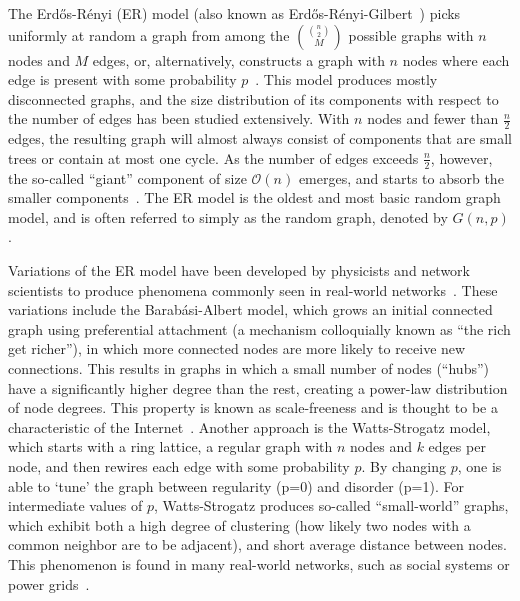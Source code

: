 The Erdős-Rényi (ER) model (also known as Erdős-Rényi-Gilbert~\cite{fienberg-2012}) picks uniformly at random a graph from among the $\binom{\binom{n}{2}}{M}$ possible graphs with $n$ nodes and $M$ edges, or, alternatively, constructs a graph with $n$ nodes where each edge is present with some probability $p$~\cite{erdos-1959, gilbert-1959}. This model produces mostly disconnected graphs, and the size distribution of its components with respect to the number of edges has been studied extensively. With $n$ nodes and fewer than $\frac{n}{2}$ edges, the resulting graph will almost always consist of components that are small trees or contain at most one cycle. As the number of edges exceeds $\frac{n}{2}$, however, the so-called ``giant'' component of size $\mathcal{O}(n)$ emerges, and starts to absorb the smaller components~\cite{janson1993birth}. The ER model is the oldest and most basic random graph model, and is often referred to simply as the random graph, denoted by $G(n,p)$.

Variations of the ER model have been developed by physicists and network scientists to produce phenomena commonly seen in real-world networks~\cite{fienberg-2012}. These variations include the Barabási-Albert model, which grows an initial connected graph using preferential attachment (a mechanism colloquially known as ``the rich get richer''), in which more connected nodes are more likely to receive new connections. This results in graphs in which a small number of nodes (``hubs'') have a significantly higher degree than the rest, creating a power-law distribution of node degrees. This property is known as scale-freeness and is thought to be a characteristic of the Internet~\cite{barabasi-albert}. Another approach is the Watts-Strogatz model, which starts with a ring lattice, a regular graph with $n$ nodes and $k$ edges per node, and then rewires each edge with some probability $p$. By changing $p$, one is able to `tune' the graph between regularity (p=0) and disorder (p=1). For intermediate values of $p$, Watts-Strogatz produces so-called ``small-world'' graphs, which exhibit both a high degree of clustering (how likely two nodes with a common neighbor are to be adjacent), and short average distance between nodes. This phenomenon is found in many real-world networks, such as social systems or power grids~\cite{Watts-1998}.

